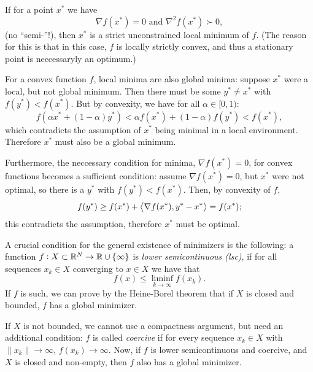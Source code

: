 \documentclass{article}
\begin{document}

If for a point \(x^*\) we have
\begin{equation*}
  \nabla f(x^*) = 0 \text{ and } \nabla^2 f(x^*) \succ 0,
\end{equation*}
(no ``semi-''!), then \(x^*\) is a strict unconstrained local minimum of \(f\).  (The reason for
this is that in this case, \(f\) is locally strictly convex, and thus a stationary point is
neccessaryly an optimum.)



For a convex function \(f\), local minima are also global minima: suppose \(x^*\) were a local, but
not global minimum.  Then there must be some \(y^* \neq x^*\) with \(f(y^*) < f(x^*)\).  But by
convexity, we have for all \(\alpha \in [0, 1)\):
\begin{equation*}
  f(\alpha x^* + (1 - \alpha) y^*) < \alpha f(x^*) + (1 - \alpha) f(y^*) < f(x^*),
\end{equation*}
which contradicts the assumption of \(x^*\) being minimal in a local environment. Therefore \(x^*\)
must also be a global minimum.

Furthermore, the neccessary condition for minima, \(\nabla f(x^*) = 0\), for convex functions
becomes a sufficient condition: assume \(\nabla f(x^*) = 0\), but \(x^*\) were not optimal, so there
is a \(y^*\) with \(f(y^*) < f(x^*)\).  Then, by convexity of \(f\),
\begin{equation*}
  f(y^*) \geq f(x^*) + \left\langle \nabla f(x^*), y^* - x^* \right\rangle = f(x^*);
\end{equation*}
this contradicts the assumption, therefore \(x^*\) must be optimal.


A crucial condition for the general existence of minimizers is the following: a function
\(f: X \subset \mathbb{R}^N \to \mathbb{R} \cup \{\infty\}\) is \emph{lower semicontinuous (lsc)}, if for all sequences
\({x_k} \in X\) converging to \(x \in X\) we have that
\begin{equation*}
  f(x) \leq \liminf_{k \to \infty} f(x_k).
\end{equation*}
If \(f\) is such, we can prove by the Heine-Borel theorem that if \(X\) is closed and bounded, \(f\)
has a global minimizer.

If \(X\) is not bounded, we cannot use a compactness argument, but need an additional condition:
\(f\) is called \emph{coercive} if for every sequence \({x_k} \in X\) with \(\lVert x_k \rVert \to
\infty\), \(f(x_k) \to \infty\).  Now, if \(f\) is lower semicontinuous and coercive, and \(X\) is
closed and non-empty, then \(f\) also has a global minimizer.
\end{document}
